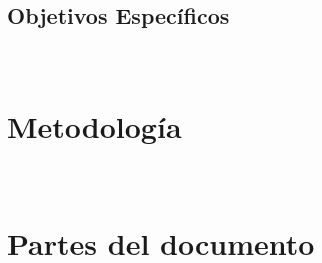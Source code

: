 \subsection{Objetivos Específicos}~\hypertarget{sec:sec122}{}
\label{sec:sec112}




\section{Metodología}~\hypertarget{sec:sec130}{}
\label{sec:sec130}



\section{Partes del documento}~\hypertarget{sec:sec140}{}
\label{sec:sec140}

